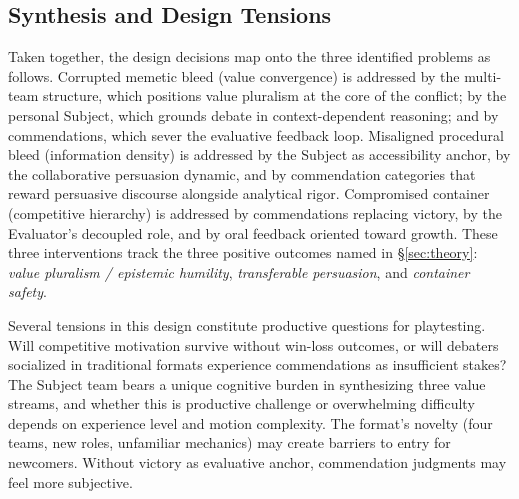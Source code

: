 \subsection{Synthesis and Design Tensions}

Taken together, the design decisions map onto the three identified problems as follows. Corrupted memetic bleed (value convergence) is addressed by the multi-team structure, which positions value pluralism at the core of the conflict; by the personal Subject, which grounds debate in context-dependent reasoning; and by commendations, which sever the evaluative feedback loop. Misaligned procedural bleed (information density) is addressed by the Subject as accessibility anchor, by the collaborative persuasion dynamic, and by commendation categories that reward persuasive discourse alongside analytical rigor. Compromised container (competitive hierarchy) is addressed by commendations replacing victory, by the Evaluator's decoupled role, and by oral feedback oriented toward growth. These three interventions track the three positive outcomes named in §\ref{sec:theory}: \textit{value pluralism / epistemic humility}, \textit{transferable persuasion}, and \textit{container safety}.

Several tensions in this design constitute productive questions for playtesting. Will competitive motivation survive without win-loss outcomes, or will debaters socialized in traditional formats experience commendations as insufficient stakes? The Subject team bears a unique cognitive burden in synthesizing three value streams, and whether this is productive challenge or overwhelming difficulty depends on experience level and motion complexity. The format's novelty (four teams, new roles, unfamiliar mechanics) may create barriers to entry for newcomers. Without victory as evaluative anchor, commendation judgments may feel more subjective.